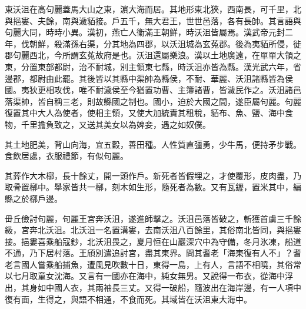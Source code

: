 \begin{pinyinscope}
 
 
 東沃沮在高句麗蓋馬大山之東，濵大海而居。其地形東北狹，西南長，可千里，北與挹婁、夫餘，南與濊貊接。戶五千，無大君王，世世邑落，各有長帥。其言語與句麗大同，時時小異。漢初，燕亡人衞滿王朝鮮，時沃沮皆屬焉。漢武帝元封二年，伐朝鮮，殺滿孫右渠，分其地為四郡，以沃沮城為玄菟郡。後為夷貊所侵，徙郡句麗西北，今所謂玄菟故府是也。沃沮還屬樂浪。漢以土地廣遠，在單單大領之東，分置東部都尉，治不耐城，別主領東七縣，時沃沮亦皆為縣。漢光武六年，省邊郡，都尉由此罷。其後皆以其縣中渠帥為縣侯，不耐、華麗、沃沮諸縣皆為侯國。夷狄更相攻伐，唯不耐濊侯至今猶置功曹、主簿諸曹，皆濊民作之。沃沮諸邑落渠帥，皆自稱三老，則故縣國之制也。國小，迫於大國之間，遂臣屬句麗。句麗復置其中大人為使者，使相主領，又使大加統責其租稅，貊布、魚、鹽、海中食物，千里擔負致之，又送其美女以為婢妾，遇之如奴僕。
 
 
 
 
 其土地肥美，背山向海，宜五糓，善田種。人性質直彊勇，少牛馬，便持矛步戰。食飲居處，衣服禮節，有似句麗。
 
 
 其葬作大木槨，長十餘丈，開一頭作戶。新死者皆假埋之，才使覆形，皮肉盡，乃取骨置槨中。舉家皆共一槨，刻木如生形，隨死者為數。又有瓦䥶，置米其中，編縣之於槨戶邊。
 
 
 
 
 毌丘儉討句麗，句麗王宮奔沃沮，遂進師擊之。沃沮邑落皆破之，斬獲首虜三千餘級，宮奔北沃沮。北沃沮一名置溝婁，去南沃沮八百餘里，其俗南北皆同，與挹婁接。挹婁喜乘船寇鈔，北沃沮畏之，夏月恒在山巖深穴中為守備，冬月氷凍，船道不通，乃下居村落。王頎別遣追討宮，盡其東界。問其耆老「海東復有人不」？耆老言國人嘗乘船捕魚，遭風見吹數十日，東得一島，上有人，言語不相曉，其俗常以七月取童女沈海。又言有一國亦在海中，純女無男。又說得一布衣，從海中浮出，其身如中國人衣，其兩袖長三丈。又得一破船，隨波出在海岸邊，有一人項中復有面，生得之，與語不相通，不食而死。其域皆在沃沮東大海中。
 
 
\end{pinyinscope}